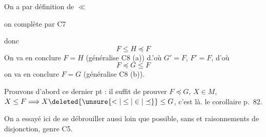 
On a par définition de $\ll$

on complète par C7

 donc
\begingroup
\makeatletter
\tagsleft@true
\let\veqno\@@leqno
\makeatother
\[
F\leq H\preceq F \tag*{$(*)$}
\]
On va en conclure $F=H$ (généralise C8 (a)) d.'où $G'=F$, $F'=F$, d'où
\[
F\preceq G\leq F \tag*{$(**)$}
\]
\endgroup
on va en conclure $F=G$ (généralise C8 (b)).

Prouvons d'abord ce dernier pt : il  suffit de prouver $F\preceq G$,   $X\in M$, $X\leq F\Longrightarrow X\deleted{\unsure{<|\leq|\in|\preceq}}\leq G$, c'est là.  le corollaire p.~82.


On a essayé ici de se débrouiller aussi loin que possible, sans  et raisonnements de disjonction, genre C5.
